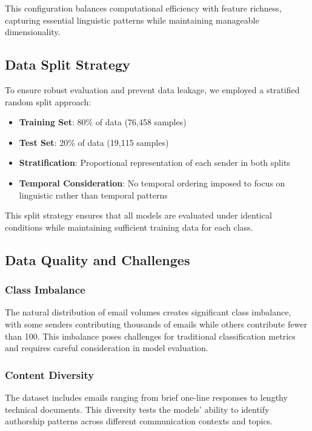 \documentclass[11pt,a4paper]{article}
\begin{document}
This configuration balances computational efficiency with feature richness, capturing essential linguistic patterns while maintaining manageable dimensionality.

\subsection{Data Split Strategy}

To ensure robust evaluation and prevent data leakage, we employed a stratified random split approach:

\begin{itemize}
    \item \textbf{Training Set}: 80\% of data (76,458 samples)
    \item \textbf{Test Set}: 20\% of data (19,115 samples)
    \item \textbf{Stratification}: Proportional representation of each sender in both splits
    \item \textbf{Temporal Consideration}: No temporal ordering imposed to focus on linguistic rather than temporal patterns
\end{itemize}

This split strategy ensures that all models are evaluated under identical conditions while maintaining sufficient training data for each class.

\subsection{Data Quality and Challenges}

\subsubsection{Class Imbalance}

The natural distribution of email volumes creates significant class imbalance, with some senders contributing thousands of emails while others contribute fewer than 100. This imbalance poses challenges for traditional classification metrics and requires careful consideration in model evaluation.

\subsubsection{Content Diversity}

The dataset includes emails ranging from brief one-line responses to lengthy technical documents. This diversity tests the models' ability to identify authorship patterns across different communication contexts and topics.
\end{document}
